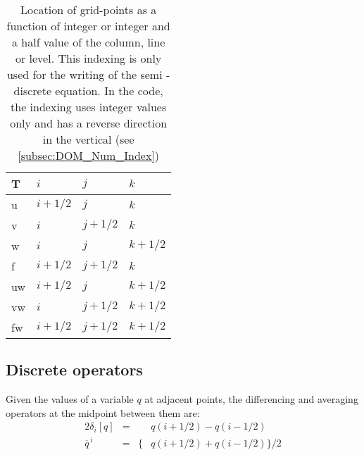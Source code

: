 \documentclass[../main/NEMO_manual]{subfiles}
\begin{document}
\begin{table}[!tb]
  \begin{center}
    \begin{tabular}{|p{46pt}|p{56pt}|p{56pt}|p{56pt}|}
      \hline
      T	& $i 		 $ & $j      $ & $k      $ \\
      \hline
      u	& $i + 1/2$ & $j      $ & $k      $ \\
      \hline
      v	& $i	 	 $ & $j + 1/2$ & $k      $ \\
      \hline
      w	& $i	 	 $ & $j      $ & $k + 1/2$ \\
      \hline
      f	& $i + 1/2$ & $j + 1/2$ & $k      $ \\
      \hline
      uw	& $i + 1/2$ & $j      $ & $k + 1/2$ \\
      \hline
      vw	& $i	 	 $ & $j + 1/2$ & $k + 1/2$ \\
      \hline
      fw	& $i + 1/2$ & $j + 1/2$ & $k + 1/2$ \\
      \hline
    \end{tabular}
    \caption{
      \protect\label{tab:cell}
      Location of grid-points as a function of integer or integer and a half value of the column, line or level.
      This indexing is only used for the writing of the semi -discrete equation.
      In the code, the indexing uses integer values only and has a reverse direction in the vertical
      (see \autoref{subsec:DOM_Num_Index})
    }
  \end{center}
\end{table}

\subsection{Discrete operators}
\label{subsec:DOM_operators}

Given the values of a variable $q$ at adjacent points, the differencing and averaging operators at
the midpoint between them are:
\begin{alignat*}{2}
  \delta_i [q]      &= &       &q (i + 1/2) - q (i - 1/2) \\
  \overline q^{\, i} &= &\big\{ &q (i + 1/2) + q (i - 1/2) \big\} / 2
\end{alignat*}
\end{document}
